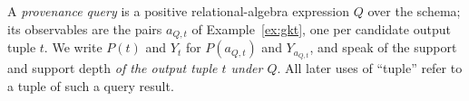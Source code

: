 \begin{definition}
  \label{def:prov-query}
  A \emph{provenance query} is a positive relational-algebra expression $Q$
  over the schema; its observables are the pairs $a_{Q,t}$ of
  Example~\ref{ex:gkt}, one per candidate output tuple $t$. We write $P(t)$
  and $Y_t$ for $P(a_{Q,t})$ and $Y_{a_{Q,t}}$, and speak of the support and
  support depth \emph{of the output tuple $t$ under $Q$}. All later uses of
  ``tuple'' refer to a tuple of such a query result.
\end{definition}
